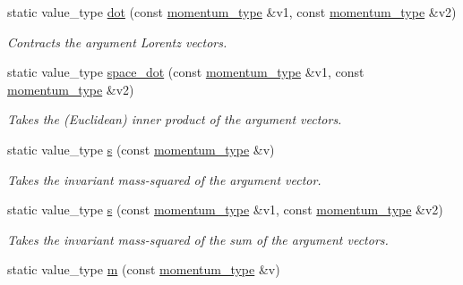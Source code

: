 \begin{DoxyCompactItemize}
\item 
\hypertarget{a00451_a85e7dff8f86c926703770d613d50b994}{}static value\+\_\+type \hyperlink{a00451_a85e7dff8f86c926703770d613d50b994}{dot} (const \hyperlink{a00579}{momentum\+\_\+type} \&v1, const \hyperlink{a00579}{momentum\+\_\+type} \&v2)\label{a00451_a85e7dff8f86c926703770d613d50b994}

\begin{DoxyCompactList}\small\item\em Contracts the argument Lorentz vectors. \end{DoxyCompactList}\item 
\hypertarget{a00451_ab5e639edbafd4b4d3e57e935d9b0bd5e}{}static value\+\_\+type \hyperlink{a00451_ab5e639edbafd4b4d3e57e935d9b0bd5e}{space\+\_\+dot} (const \hyperlink{a00579}{momentum\+\_\+type} \&v1, const \hyperlink{a00579}{momentum\+\_\+type} \&v2)\label{a00451_ab5e639edbafd4b4d3e57e935d9b0bd5e}

\begin{DoxyCompactList}\small\item\em Takes the (Euclidean) inner product of the argument vectors. \end{DoxyCompactList}\item 
\hypertarget{a00451_a001116beb90eeda48f7cb668f67c8995}{}static value\+\_\+type \hyperlink{a00451_a001116beb90eeda48f7cb668f67c8995}{s} (const \hyperlink{a00579}{momentum\+\_\+type} \&v)\label{a00451_a001116beb90eeda48f7cb668f67c8995}

\begin{DoxyCompactList}\small\item\em Takes the invariant mass-\/squared of the argument vector. \end{DoxyCompactList}\item 
\hypertarget{a00451_a9d16152b17353661ccb6e1f03047da8e}{}static value\+\_\+type \hyperlink{a00451_a9d16152b17353661ccb6e1f03047da8e}{s} (const \hyperlink{a00579}{momentum\+\_\+type} \&v1, const \hyperlink{a00579}{momentum\+\_\+type} \&v2)\label{a00451_a9d16152b17353661ccb6e1f03047da8e}

\begin{DoxyCompactList}\small\item\em Takes the invariant mass-\/squared of the sum of the argument vectors. \end{DoxyCompactList}\item 
\hypertarget{a00451_a3a9390d5b0f36b7778161963c43843b0}{}static value\+\_\+type \hyperlink{a00451_a3a9390d5b0f36b7778161963c43843b0}{m} (const \hyperlink{a00579}{momentum\+\_\+type} \&v)\label{a00451_a3a9390d5b0f36b7778161963c43843b0}


\end{DoxyCompactItemize}
